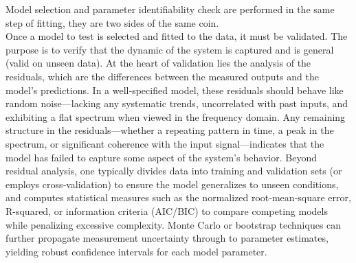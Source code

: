 Model selection and parameter identifiability check are performed in the same step of fitting, they are two sides of the same coin.\\
Once a model to test is selected and fitted to the data, it must be validated. The purpose is to verify that the dynamic of the system is captured and is general (valid on unseen data). 
At the heart of validation lies the analysis of the residuals, which are the differences between the measured outputs and the model’s predictions. In a well‐specified model, these residuals should behave like random noise—lacking any systematic trends, uncorrelated with past inputs, and exhibiting a flat spectrum when viewed in the frequency domain. Any remaining structure in the residuals—whether a repeating pattern in time, a peak in the spectrum, or significant coherence with the input signal—indicates that the model has failed to capture some aspect of the system’s behavior. Beyond residual analysis, one typically divides data into training and validation sets (or employs cross‐validation) to ensure the model generalizes to unseen conditions, and computes statistical measures such as the normalized root‐mean‐square error, R-squared, or information criteria (AIC/BIC) to compare competing models while penalizing excessive complexity. Monte Carlo or bootstrap techniques can further propagate measurement uncertainty through to parameter estimates, yielding robust confidence intervals for each model parameter.
